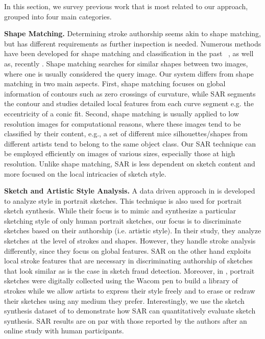 In this section, we survey previous work that is most related to our approach, grouped into four main categories.

\noindent\textbf{Shape Matching.} \label{subsec: shapematching}
Determining stroke authorship seems akin to shape matching, but has different requirements as further inspection is needed. Numerous methods have been developed for shape matching and classification in the past ~\cite{mokhtarian1992theory,belongie2001matching,jin2003image,berg2005shape}, as well as, recently \cite{Michel:2011:SID:1994006.1994152,ion-cviu-11}. Shape matching searches for similar shapes between two images, where one is usually considered the query image. Our system differs from shape matching in two main aspects. First, shape matching focuses on global information of contours such as zero crossings of curvature, while SAR segments the contour and studies detailed local features from each curve segment e.g. the eccentricity of a conic fit. Second, shape matching is usually applied to low resolution images for computational reasons, where these images tend to be classified by their content, e.g., a set of different mice silhouettes/shapes from different artists tend to belong to the same object class. Our SAR technique can be employed efficiently on images of various sizes, especially those at high resolution. Unlike shape matching, SAR is less dependent on sketch content and more focused on the local intricacies of sketch style. %

\noindent\textbf{Sketch and Artistic Style Analysis.}\label{subsec: artisticanalysis}
A data driven approach in \cite{Berger:2013:SAP:2461912.2461964} is developed to analyze style in portrait sketches. This technique is also used for portrait sketch synthesis. While their focus is to mimic and synthesize a particular sketching style of only human portrait sketches, our focus is to discriminate sketches based on their authorship (i.e. artistic style). In their study, they analyze sketches at the level of strokes and shapes. However, they handle stroke analysis differently, since they focus on global features. SAR on the other hand exploits local stroke features that are necessary in discriminating authorship of sketches that look similar as is the case in sketch fraud detection. Moreover, in \cite{Berger:2013:SAP:2461912.2461964}, portrait sketches were digitally collected using the Wacom pen to build a library of strokes while we allow artists to express their style freely and to erase or redraw their sketches using any medium they prefer. Interestingly, we use the sketch synthesis dataset of \cite{Berger:2013:SAP:2461912.2461964} to demonstrate how SAR can quantitatively evaluate sketch synthesis. SAR results are on par with those reported by the authors after an online study with human participants.

